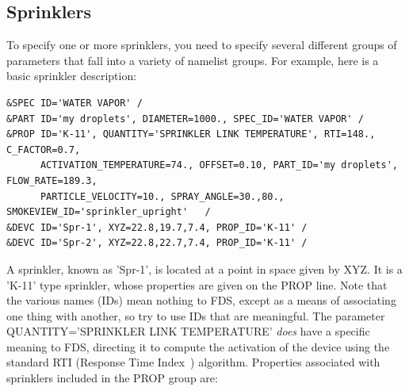 \documentclass[11pt]{book}
\begin{document}
\subsection{Sprinklers}
\label{info:sprinklers}

To specify one or more sprinklers, you need to specify several different groups of parameters that fall into a variety of namelist groups. For example, here is a basic sprinkler description:
\begin{lstlisting}
&SPEC ID='WATER VAPOR' /
&PART ID='my droplets', DIAMETER=1000., SPEC_ID='WATER VAPOR' /
&PROP ID='K-11', QUANTITY='SPRINKLER LINK TEMPERATURE', RTI=148., C_FACTOR=0.7,
      ACTIVATION_TEMPERATURE=74., OFFSET=0.10, PART_ID='my droplets', FLOW_RATE=189.3,
      PARTICLE_VELOCITY=10., SPRAY_ANGLE=30.,80., SMOKEVIEW_ID='sprinkler_upright'   /
&DEVC ID='Spr-1', XYZ=22.8,19.7,7.4, PROP_ID='K-11' /
&DEVC ID='Spr-2', XYZ=22.8,22.7,7.4, PROP_ID='K-11' /
\end{lstlisting}
A sprinkler, known as {\ct 'Spr-1'}, is located at a point in space given by {\ct XYZ}. It is a {\ct 'K-11'} type sprinkler, whose properties are given on the {\ct PROP} line. Note that the various names ({\ct ID}s) mean nothing to FDS, except as a means of associating one thing with another, so try to use {\ct ID}s that are meaningful.  The parameter {\ct QUANTITY='SPRINKLER LINK TEMPERATURE'} {\em does} have a specific meaning to FDS, directing it to compute the activation of the device using the standard RTI (Response Time Index~\cite{Heskestad:3}) algorithm. Properties associated with sprinklers included in the {\ct PROP} group are:
\end{document}

